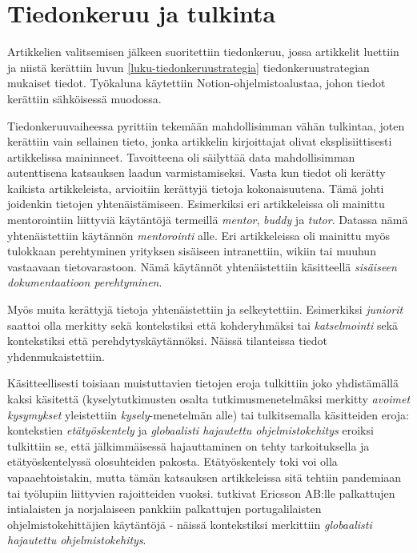 \documentclass[utf8]{gradu3}
\begin{document}
\section{Tiedonkeruu ja tulkinta}

Artikkelien valitsemisen jälkeen suoritettiin tiedonkeruu, jossa artikkelit luettiin ja niistä kerättiin luvun \ref{luku-tiedonkeruustrategia} tiedonkeruustrategian mukaiset tiedot. Työkaluna käytettiin Notion-ohjelmistoalustaa, johon tiedot kerättiin sähköisessä muodossa. 

Tiedonkeruuvaiheessa pyrittiin tekemään mahdollisimman vähän tulkintaa, joten kerättiin vain sellainen tieto, jonka artikkelin kirjoittajat olivat eksplisiittisesti artikkelissa maininneet. Tavoitteena oli säilyttää data mahdollisimman autenttisena katsauksen laadun varmistamiseksi. Vasta kun tiedot oli kerätty kaikista artikkeleista, arvioitiin kerättyjä tietoja kokonaisuutena. Tämä johti joidenkin tietojen yhtenäistämiseen. Esimerkiksi eri artikkeleissa oli mainittu mentorointiin liittyviä käytäntöjä termeillä \textit{mentor}, \textit{buddy} ja \textit{tutor}. Datassa nämä yhtenäistettiin käytännön \textit{mentorointi} alle. Eri artikkeleissa oli mainittu myös tulokkaan perehtyminen yrityksen sisäiseen intranettiin, wikiin tai muuhun vastaavaan tietovarastoon. Nämä käytännöt yhtenäistettiin käsitteellä \textit{sisäiseen dokumentaatioon perehtyminen}.

Myös muita kerättyjä tietoja yhtenäistettiin ja selkeytettiin. Esimerkiksi \textit{juniorit} saattoi olla merkitty sekä kontekstiksi että kohderyhmäksi tai \textit{katselmointi} sekä kontekstiksi että perehdytyskäytännöksi. Näissä tilanteissa tiedot yhdenmukaistettiin.

Käsitteellisesti toisiaan muistuttavien tietojen eroja tulkittiin joko yhdistämällä kaksi käsitettä (kyselytutkimusten osalta tutkimusmenetelmäksi merkitty \textit{avoimet kysymykset} yleistettiin \textit{kysely}-menetelmän alle) tai tulkitsemalla käsitteiden eroja: kontekstien \textit{etätyöskentely} ja \textit{globaalisti hajautettu ohjelmistokehitys} eroiksi tulkittiin se, että jälkimmäisessä hajauttaminen on tehty tarkoituksella ja etätyöskentelyssä olosuhteiden pakosta. Etätyöskentely toki voi olla vapaaehtoistakin, mutta tämän katsauksen artikkeleissa sitä tehtiin pandemiaan \parencite{rodeghero-ym-2021} tai työlupiin \parencite{hemphill-begel-2011} liittyvien rajoitteiden vuoksi. \textcite{britto-ym-2020} tutkivat Ericsson AB:lle palkattujen intialaisten ja \textcite{moe-ym-2020} norjalaiseen pankkiin palkattujen portugalilaisten ohjelmistokehittäjien käytäntöjä - näissä kontekstiksi merkittiin \textit{globaalisti hajautettu ohjelmistokehitys}.
\end{document}
